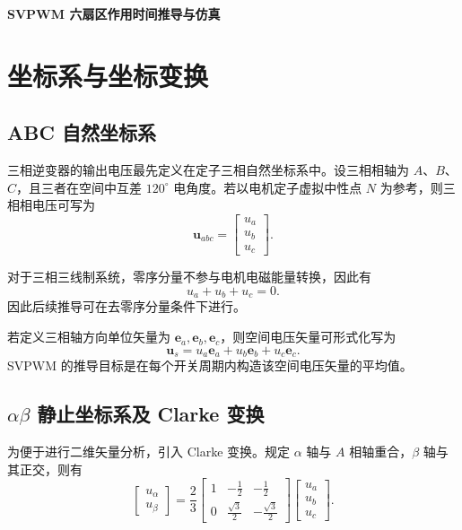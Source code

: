 \documentclass[a4paper, 12pt]{ctexart}
\begin{document}
\begin{center}
  {\bfseries SVPWM 六扇区作用时间推导与仿真}
\end{center}

\vspace{1em}

\tableofcontents
\clearpage

\section{坐标系与坐标变换}

\subsection{ABC 自然坐标系}

三相逆变器的输出电压最先定义在定子三相自然坐标系中。设三相相轴为 $A$、$B$、$C$，且三者在空间中互差 $120^\circ$ 电角度。若以电机定子虚拟中性点 $N$ 为参考，则三相相电压可写为
\[
  \boldsymbol u_{abc}
  =
  \begin{bmatrix}
    u_a \\ u_b \\ u_c
  \end{bmatrix}.
\]

对于三相三线制系统，零序分量不参与电机电磁能量转换，因此有
\[
  u_a + u_b + u_c = 0.
\]
因此后续推导可在去零序分量条件下进行。

若定义三相轴方向单位矢量为 $\boldsymbol e_a,\boldsymbol e_b,\boldsymbol e_c$，则空间电压矢量可形式化写为
\[
  \boldsymbol u_s = u_a \boldsymbol e_a + u_b \boldsymbol e_b + u_c \boldsymbol e_c.
\]
SVPWM 的推导目标是在每个开关周期内构造该空间电压矢量的平均值。

\subsection{\texorpdfstring{$\alpha\beta$}{alpha-beta} 静止坐标系及 Clarke 变换}

为便于进行二维矢量分析，引入 Clarke 变换。规定 $\alpha$ 轴与 $A$ 相轴重合，$\beta$ 轴与其正交，则有
\[
  \begin{bmatrix}
    u_\alpha \\ u_\beta
  \end{bmatrix}
  =
  \frac{2}{3}
  \begin{bmatrix}
    1 & -\frac{1}{2}       & -\frac{1}{2}        \\
    0 & \frac{\sqrt{3}}{2} & -\frac{\sqrt{3}}{2}
  \end{bmatrix}
  \begin{bmatrix}
    u_a \\ u_b \\ u_c
  \end{bmatrix}.
\]
\end{document}
